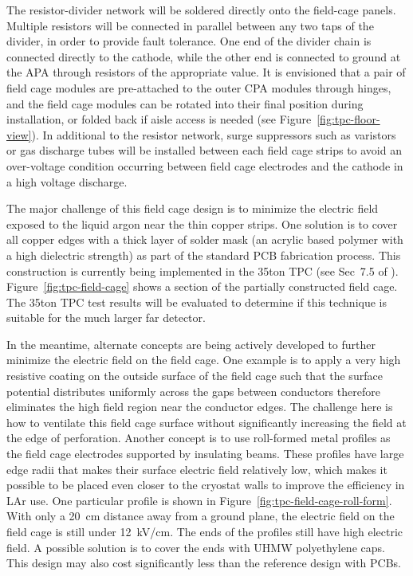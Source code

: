 The resistor-divider network will be soldered directly onto the
field-cage panels. Multiple resistors will be connected in parallel
between any two taps of the divider, in order to provide fault
tolerance. One end of the divider chain is connected directly to the
cathode, while the other end is connected to ground at the APA through
resistors of the appropriate value.  It is envisioned that a pair of
field cage modules are pre-attached to the outer CPA modules through
hinges, and the field cage modules can be rotated into their final
position during installation, or folded back if aisle access is needed
(see Figure~\ref{fig:tpc-floor-view}).  In additional to the resistor
network, surge suppressors such as varistors or gas discharge tubes
will be installed between each field cage strips to avoid an
over-voltage condition occurring between field cage electrodes and the
cathode in a high voltage discharge.

The major challenge of this field cage design is to minimize the electric field exposed to the liquid argon near the thin copper strips.  One solution is to cover all copper edges with a thick layer of solder mask (an acrylic based polymer with a high dielectric strength) as part of the standard PCB fabrication process.  This construction is currently being implemented in the 35ton TPC (see Sec~7.5 of \anxlbnefd).  Figure~\ref{fig:tpc-field-cage} shows a section of the partially constructed field cage.  The 35ton TPC test results will be evaluated to determine if this technique is suitable for the much larger far detector. 
 
In the meantime, alternate concepts are being actively developed to further minimize the electric field on the field cage.  One example is to apply a very high resistive coating on the outside surface of the field cage such that the surface potential distributes uniformly across the gaps between conductors therefore eliminates the high field region near the conductor edges.  The challenge here is how to ventilate this field cage surface without significantly increasing the field at the edge of perforation.  Another concept is to use roll-formed metal profiles as the field cage electrodes supported by insulating beams.  These profiles have large edge radii that makes their surface electric field relatively low, which makes it possible to be placed even closer to the cryostat walls to improve the efficiency in LAr use.  One particular profile is shown in Figure~\ref{fig:tpc-field-cage-roll-form}.  With only a 20~cm distance away from a ground plane, the electric field on the field cage is still under 12~kV/cm.  The ends of the profiles still have high electric field.  A possible solution is to cover the ends with UHMW polyethylene caps.  This design may also cost significantly less than the reference design with PCBs.

